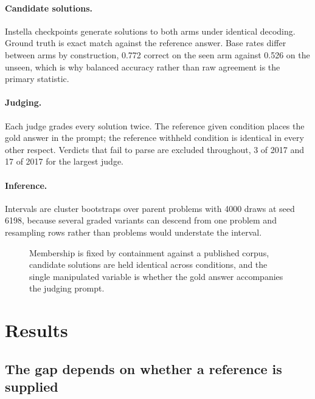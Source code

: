 \paragraph{Candidate solutions.} Instella checkpoints generate solutions to both arms under
identical decoding. Ground truth is exact match against the reference answer. Base rates
differ between arms by construction, 0.772 correct on the seen arm against 0.526 on the
unseen, which is why balanced accuracy rather than raw agreement is the primary statistic.

\paragraph{Judging.} Each judge grades every solution twice. The reference given condition
places the gold answer in the prompt; the reference withheld condition is identical in every
other respect. Verdicts that fail to parse are excluded throughout, 3 of 2017 and 17 of 2017
for the largest judge.

\paragraph{Inference.} Intervals are cluster bootstraps over parent problems with 4000 draws
at seed 6198, because several graded variants can descend from one problem and resampling
rows rather than problems would understate the interval.

\begin{figure}[t]
\centering
{}
\caption{Membership is fixed by containment against a published corpus, candidate solutions
are held identical across conditions, and the single manipulated variable is whether the
gold answer accompanies the judging prompt.}
\label{fig:pipeline}
\end{figure}

\section{Results}

\subsection{The gap depends on whether a reference is supplied}

